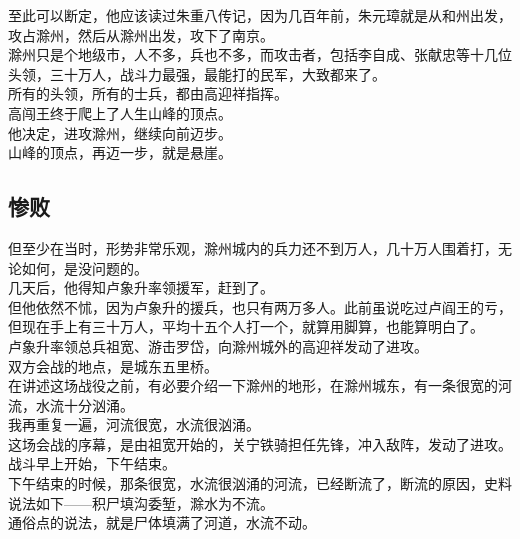 \begin{multicols}{\theparacolNo}
至此可以断定，他应该读过朱重八传记，因为几百年前，朱元璋就是从和州出发，攻占滁州，然后从滁州出发，攻下了南京。\\

滁州只是个地级市，人不多，兵也不多，而攻击者，包括李自成、张献忠等十几位头领，三十万人，战斗力最强，最能打的民军，大致都来了。\\

所有的头领，所有的士兵，都由高迎祥指挥。\\

高闯王终于爬上了人生山峰的顶点。\\

他决定，进攻滁州，继续向前迈步。\\

山峰的顶点，再迈一步，就是悬崖。\\

\subsection{惨败}
但至少在当时，形势非常乐观，滁州城内的兵力还不到万人，几十万人围着打，无论如何，是没问题的。\\

几天后，他得知卢象升率领援军，赶到了。\\

但他依然不怵，因为卢象升的援兵，也只有两万多人。此前虽说吃过卢阎王的亏，但现在手上有三十万人，平均十五个人打一个，就算用脚算，也能算明白了。\\

卢象升率领总兵祖宽、游击罗岱，向滁州城外的高迎祥发动了进攻。\\

双方会战的地点，是城东五里桥。\\

在讲述这场战役之前，有必要介绍一下滁州的地形，在滁州城东，有一条很宽的河流，水流十分汹涌。\\

我再重复一遍，河流很宽，水流很汹涌。\\

这场会战的序幕，是由祖宽开始的，关宁铁骑担任先锋，冲入敌阵，发动了进攻。\\

战斗早上开始，下午结束。\\

下午结束的时候，那条很宽，水流很汹涌的河流，已经断流了，断流的原因，史料说法如下——积尸填沟委堑，滁水为不流。\\

通俗点的说法，就是尸体填满了河道，水流不动。\\


\end{multicols}
